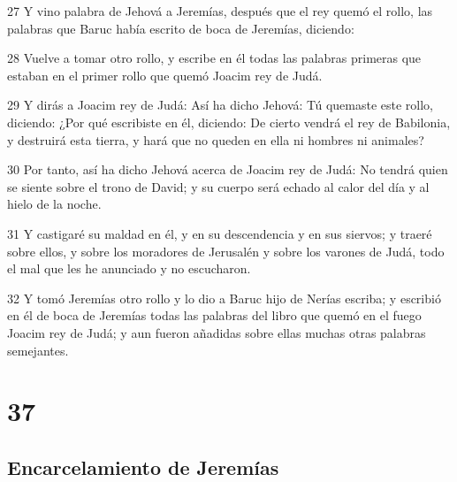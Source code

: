 \par 27 Y vino palabra de Jehová a Jeremías, después que el rey quemó el rollo, las palabras que Baruc había escrito de boca de Jeremías, diciendo:
\par 28 Vuelve a tomar otro rollo, y escribe en él todas las palabras primeras que estaban en el primer rollo que quemó Joacim rey de Judá.
\par 29 Y dirás a Joacim rey de Judá: Así ha dicho Jehová: Tú quemaste este rollo, diciendo: ¿Por qué escribiste en él, diciendo: De cierto vendrá el rey de Babilonia, y destruirá esta tierra, y hará que no queden en ella ni hombres ni animales?
\par 30 Por tanto, así ha dicho Jehová acerca de Joacim rey de Judá: No tendrá quien se siente sobre el trono de David; y su cuerpo será echado al calor del día y al hielo de la noche.
\par 31 Y castigaré su maldad en él, y en su descendencia y en sus siervos; y traeré sobre ellos, y sobre los moradores de Jerusalén y sobre los varones de Judá, todo el mal que les he anunciado y no escucharon.
\par 32 Y tomó Jeremías otro rollo y lo dio a Baruc hijo de Nerías escriba; y escribió en él de boca de Jeremías todas las palabras del libro que quemó en el fuego Joacim rey de Judá; y aun fueron añadidas sobre ellas muchas otras palabras semejantes.

\chapter{37}

\section*{Encarcelamiento de Jeremías}


